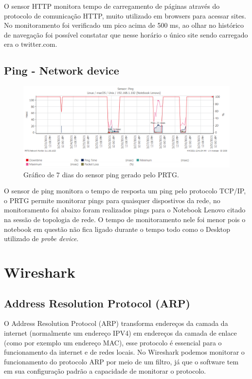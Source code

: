 \documentclass[12pt]{article}
\begin{document}
O sensor HTTP monitora tempo de carregamento de páginas através do protocolo de comunicação HTTP, muito utilizado em browsers para acessar sites. No monitoramento foi verificado um pico acima de 500 ms, ao olhar no histórico de navegação foi possível constatar que nesse horário o único site sendo carregado era o twitter.com.

\subsection{Ping - Network device}

\begin{figure}[H]
    \includegraphics[width=\linewidth]{ping_notebook.png}
    \caption{Gráfico de 7 dias do sensor ping gerado pelo PRTG.}
\end{figure}

O sensor de ping monitora o tempo de resposta um ping pelo protocolo TCP/IP, o PRTG permite monitorar pings para quaisquer dispostivos da rede, no monitoramento foi abaixo foram realizados pings para o Notebook Lenovo citado na sessão de topologia de rede. O tempo de monitoramento nele foi menor pois o notebook em questão não fica ligado durante o tempo todo como o Desktop utilizado de \emph{probe device}.

\section{Wireshark}

\subsection{Address Resolution Protocol (ARP)}

O Address Resolution Protocol (ARP) transforma endereços da camada da internet (normalmente um endereço IPV4) em endereços da camada de enlace (como por exemplo um endereço MAC), esse protocolo é essencial para o funcionamento da internet e de redes locais. No Wireshark podemos monitorar o funcionamento do protocolo ARP por meio de um filtro, já que o software tem em sua configuração padrão a capacidade de monitorar o protocolo.
\end{document}
